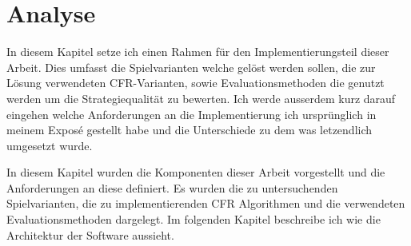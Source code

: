 \chapter{Analyse}
In diesem Kapitel setze ich einen Rahmen für den Implementierungsteil dieser Arbeit. 
Dies umfasst die Spielvarianten welche gelöst werden sollen, die zur Lösung verwendeten CFR-Varianten, sowie Evaluationsmethoden die genutzt werden um die Strategiequalität zu bewerten. 
Ich werde ausserdem kurz darauf eingehen welche Anforderungen an die Implementierung ich ursprünglich in meinem Exposé gestellt habe und die Unterschiede zu dem was letzendlich umgesetzt wurde.





In diesem Kapitel wurden die Komponenten dieser Arbeit vorgestellt und die Anforderungen an diese definiert. 
Es wurden die zu untersuchenden Spielvarianten, die zu implementierenden CFR Algorithmen und die verwendeten Evaluationsmethoden dargelegt. 
Im folgenden Kapitel beschreibe ich wie die Architektur der Software aussieht.